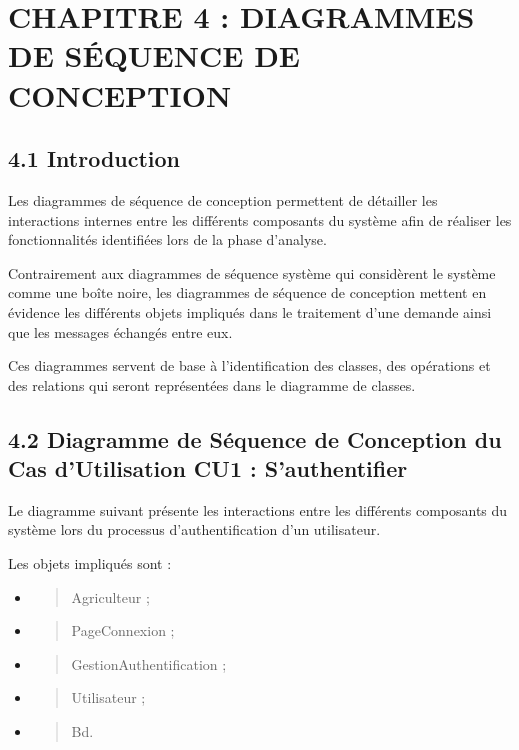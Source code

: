 \documentclass[
]{article}
\begin{document}
\hypertarget{chapitre-4-diagrammes-de-suxe9quence-de-conception}{%
\section{CHAPITRE 4 : DIAGRAMMES DE SÉQUENCE DE
CONCEPTION}\label{chapitre-4-diagrammes-de-suxe9quence-de-conception}}

\hypertarget{introduction-2}{%
\subsection{4.1 Introduction}\label{introduction-2}}

Les diagrammes de séquence de conception permettent de détailler les
interactions internes entre les différents composants du système afin de
réaliser les fonctionnalités identifiées lors de la phase d'analyse.

Contrairement aux diagrammes de séquence système qui considèrent le
système comme une boîte noire, les diagrammes de séquence de conception
mettent en évidence les différents objets impliqués dans le traitement
d'une demande ainsi que les messages échangés entre eux.

Ces diagrammes servent de base à l'identification des classes, des
opérations et des relations qui seront représentées dans le diagramme de
classes.

\hypertarget{diagramme-de-suxe9quence-de-conception-du-cas-dutilisation-cu1-sauthentifier}{%
\subsection{4.2 Diagramme de Séquence de Conception du Cas d'Utilisation
CU1 :
S'authentifier}\label{diagramme-de-suxe9quence-de-conception-du-cas-dutilisation-cu1-sauthentifier}}

Le diagramme suivant présente les interactions entre les différents
composants du système lors du processus d'authentification d'un
utilisateur.

Les objets impliqués sont :

\begin{itemize}
\item
  \begin{quote}
  Agriculteur ;
  \end{quote}
\item
  \begin{quote}
  PageConnexion ;
  \end{quote}
\item
  \begin{quote}
  GestionAuthentification ;
  \end{quote}
\item
  \begin{quote}
  Utilisateur ;
  \end{quote}
\item
  \begin{quote}
  Bd.
  \end{quote}
\end{itemize}
\end{document}
